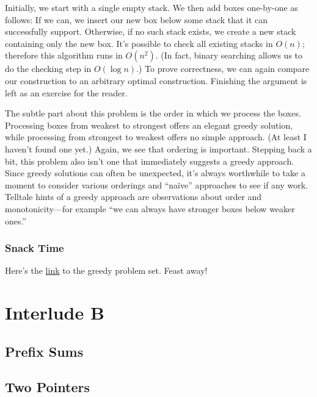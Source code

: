 Initially, we start with a single empty stack. We then add boxes one-by-one as follows: If we can, we insert our new box below some stack that it can successfully support. Otherwise, if no such stack exists, we create a new stack containing only the new box. It's possible to check all existing stacks in $O(n)$; therefore this algorithm runs in $O(n^2)$. (In fact, binary searching allows us to do the checking step in $O(\log n)$.) To prove correctness, we can again compare our construction to an arbitrary optimal construction. Finishing the argument is left as an exercise for the reader.

The subtle part about this problem is the order in which we process the boxes. Processing boxes from weakest to strongest offers an elegant greedy solution, while processing from strongest to weakest offers no simple approach. (At least I haven't found one yet.) Again, we see that ordering is important. Stepping back a bit, this problem also isn't one that immediately suggests a greedy approach. Since greedy solutions can often be unexpected, it's always worthwhile to take a moment to consider various orderings and ``na\"ive'' approaches to see if any work. Telltale hints of a greedy approach are observations about order and monotonicity---for example ``we can always have stronger boxes below weaker ones.''

\subsection{Snack Time}

Here's the \href{http://codeforces.com}{link} to the greedy problem set. Feast away!

\chapter*{Interlude B}

\section{Prefix Sums}

\section{Two Pointers}

